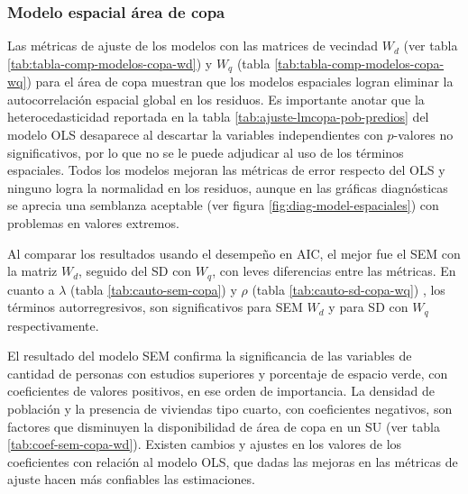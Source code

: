 \documentclass[12pt,a4paper,openany]{book}
\theoremstyle{definition}
\theoremstyle{definition}
\theoremstyle{definition}
\theoremstyle{remark}
\begin{document}
\subsubsection{Modelo espacial área de
copa}\label{modelo-espacial-area-de-copa}

Las métricas de ajuste de los modelos con las matrices de vecindad
\(W_d\) (ver tabla \ref{tab:tabla-comp-modelos-copa-wd}) y \(W_q\)
(tabla \ref{tab:tabla-comp-modelos-copa-wq}) para el área de copa
muestran que los modelos espaciales logran eliminar la autocorrelación
espacial global en los residuos. Es importante anotar que la
heterocedasticidad reportada en la tabla
\ref{tab:ajuste-lmcopa-pob-predios} del modelo OLS desaparece al
descartar la variables independientes con \(p\)-valores no
significativos, por lo que no se le puede adjudicar al uso de los
términos espaciales. Todos los modelos mejoran las métricas de error
respecto del OLS y ninguno logra la normalidad en los residuos, aunque
en las gráficas diagnósticas se aprecia una semblanza aceptable (ver
figura \ref{fig:diag-model-espaciales}) con problemas en valores
extremos.

Al comparar los resultados usando el desempeño en AIC, el mejor fue el
SEM con la matriz \(W_d\), seguido del SD con \(W_q\), con leves
diferencias entre las métricas. En cuanto a \(\lambda\) (tabla
\ref{tab:cauto-sem-copa}) y \(\rho\) (tabla \ref{tab:cauto-sd-copa-wq})
, los términos autorregresivos, son significativos para SEM \(W_d\) y
para SD con \(W_q\) respectivamente.

El resultado del modelo SEM confirma la significancia de las variables
de cantidad de personas con estudios superiores y porcentaje de espacio
verde, con coeficientes de valores positivos, en ese orden de
importancia. La densidad de población y la presencia de viviendas tipo
cuarto, con coeficientes negativos, son factores que disminuyen la
disponibilidad de área de copa en un SU (ver tabla
\ref{tab:coef-sem-copa-wd}). Existen cambios y ajustes en los valores de
los coeficientes con relación al modelo OLS, que dadas las mejoras en
las métricas de ajuste hacen más confiables las estimaciones.
\end{document}
